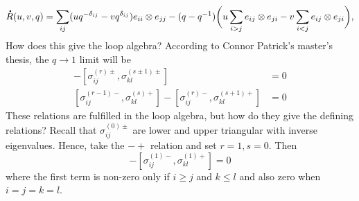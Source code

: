 \documentclass[11pt]{report}
\newcommand*{\dt}[1]{%
  \accentset{\mbox{\large\bfseries .}}{#1}}
\theoremstyle{definition}
\theoremstyle{remark}
\theoremstyle{remark}
\begin{document}
\begin{equation*}
\dt R(u,v,q) = \sum_{ij} (u q^{-\delta_{ij}} - v q^{\delta_{ij}}) e_{ii} \otimes e_{jj} - (q-q^{-1}) \bigg( u \sum_{i > j} e_{ij} \otimes e_{ji} - v \sum_{i < j} e_{ij} \otimes e_{ji} \bigg),
\end{equation*}
How does this give the loop algebra? According to Connor Patrick's master's thesis, the $q \to 1$ limit will be
\begin{align*}
[\sigma_{ij}^{(r \pm 1)\pm},\sigma_{kl}^{(s)\pm}] - [\sigma_{ij}^{(r)\pm},\sigma_{kl}^{(s \pm 1)\pm}] &= 0 \\
[\sigma_{ij}^{(r-1)-},\sigma_{kl}^{(s)+}] - [\sigma_{ij}^{(r)-},\sigma_{kl}^{(s+1)+}] &= 0
\end{align*}
These relations are fulfilled in the loop algebra, but how do they give the defining relations? Recall that $\sigma_{ij}^{(0)\pm}$ are lower and upper triangular with inverse eigenvalues. Hence, take the $-+$ relation and set $r=1, s=0$. Then
\begin{equation*}
[\sigma_{ij}^{(0)-},\sigma_{kl}^{(0)+}] - [\sigma_{ij}^{(1)-},\sigma_{kl}^{(1)+}] = 0
\end{equation*}
where the first term is non-zero only if $i \geq j$ and $k \leq l$ and also zero when $i=j=k=l$.
\end{document}
